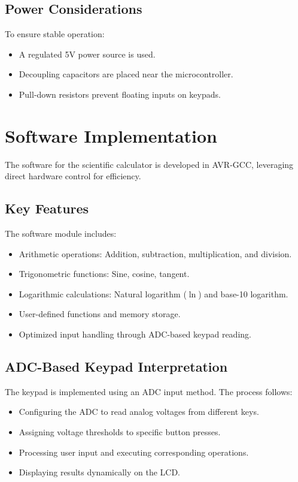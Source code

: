 \documentclass[journal]{IEEEtran}
\begin{document}
\subsection{Power Considerations}
To ensure stable operation:
\begin{itemize}
    \item A regulated 5V power source is used.
    \item Decoupling capacitors are placed near the microcontroller.
    \item Pull-down resistors prevent floating inputs on keypads.
\end{itemize}

\section{Software Implementation}
The software for the scientific calculator is developed in AVR-GCC, leveraging direct hardware control for efficiency.

\subsection{Key Features}
The software module includes:
\begin{itemize}
    \item Arithmetic operations: Addition, subtraction, multiplication, and division.
    \item Trigonometric functions: Sine, cosine, tangent.
    \item Logarithmic calculations: Natural logarithm (\(\ln\)) and base-10 logarithm.
    \item User-defined functions and memory storage.
    \item Optimized input handling through ADC-based keypad reading.
\end{itemize}

\subsection{ADC-Based Keypad Interpretation}
The keypad is implemented using an ADC input method. The process follows:
\begin{itemize}
    \item Configuring the ADC to read analog voltages from different keys.
    \item Assigning voltage thresholds to specific button presses.
    \item Processing user input and executing corresponding operations.
    \item Displaying results dynamically on the LCD.
\end{itemize}
\end{document}
